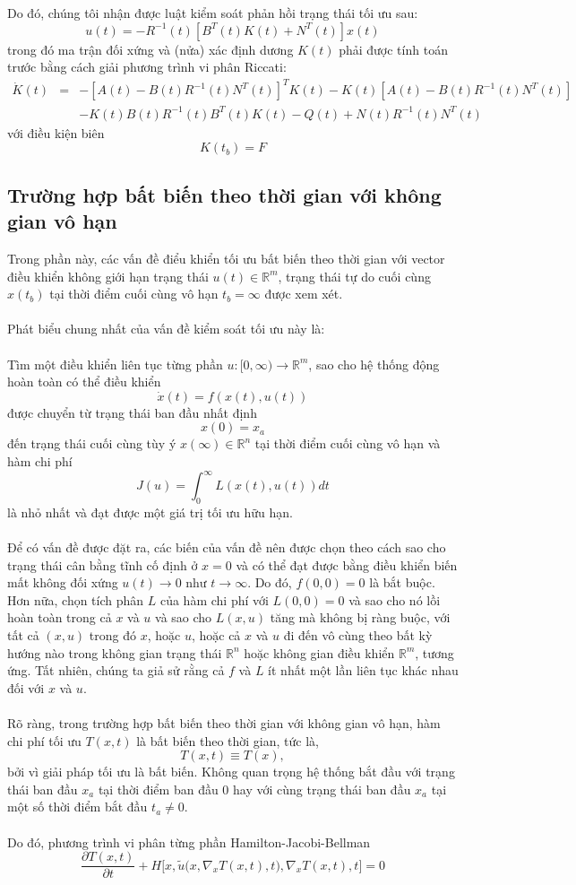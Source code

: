 \documentclass[12pt,a4paper]{report}
\begin{document}
	Do đó, chúng tôi nhận được luật kiểm soát phản hồi trạng thái tối ưu sau: $$u(t) = -R^{-1}(t)[B^T(t)K(t) + N^T(t)]x(t)$$
	trong đó ma trận đối xứng và (nửa) xác định dương $K(t)$ phải được tính toán trước bằng cách giải phương trình vi phân Riccati:
\begin{eqnarray}
	\dot{K}(t) &=& -[A(t) - B(t)R^{-1}(t)N^T(t)]^TK(t) - K(t)[A(t) - B(t)R^{-1}(t)N^T(t)] \nonumber \\ &&-K(t)B(t)R^{-1}(t)B^T(t)K(t) - Q(t) + N(t)R^{-1}(t)N^T(t) \nonumber
\end{eqnarray} với điều kiện biên $$K(t_b) = F$$
\subsection{Trường hợp bất biến theo thời gian với không gian vô hạn}
Trong phần này, các vấn đề điểu khiển tối ưu bất biến theo thời gian với vector điều khiển không giới hạn trạng thái $u(t) \in \mathbb{R}^m$, trạng thái tự do cuối cùng $x(t_b)$ tại thời điểm cuối cùng vô hạn $t_b = \infty$ được xem xét.\\\\Phát biểu chung nhất của vấn đề kiểm soát tối ưu này là:\\\\ 
Tìm một điều khiển liên tục từng phần $u: [0, \infty) \to \mathbb{R}^m$, sao cho hệ thống động hoàn toàn có thể điều khiển $$\dot{x}(t) = f(x(t), u(t))$$ được chuyển từ trạng thái ban đầu nhất định $$x(0) = x_a $$ đến trạng thái cuối cùng tùy ý $x(\infty) \in \mathbb{R}^n$ tại thời điểm cuối cùng vô hạn và hàm chi phí $$J(u) = \int_{0}^{\infty}L(x(t), u(t))dt$$ là nhỏ nhất và đạt được một giá trị tối ưu hữu hạn.	\\\\ Để có vấn đề được đặt ra, các biến của vấn đề nên được chọn theo cách sao cho trạng thái cân bằng tĩnh cố định ở $x = 0$ và có thể đạt được bằng điều khiển biến mất không đối xứng $u(t) \to 0$ như $t \to \infty$. Do đó, $f(0,0) = 0$ là bắt buộc. Hơn nữa, chọn tích phân $L$ của hàm chi phí với $L(0, 0) = 0$ và sao cho nó lồi hoàn toàn trong cả $x$ và $u$ và sao cho $L (x, u)$ tăng mà không bị ràng buộc, với tất cả $(x, u)$ trong đó $x$, hoặc $u$, hoặc cả $x$ và $u$ đi đến vô cùng theo bất kỳ hướng nào trong không gian trạng thái $\mathbb{R}^n$ hoặc không gian điều khiển $\mathbb{R}^m$, tương ứng. Tất nhiên, chúng ta giả sử rằng cả $f$ và $L$ ít nhất một lần liên tục khác nhau đối với $x$ và $u$. \\\\
Rõ ràng, trong trường hợp bất biến theo thời gian với không gian vô hạn, hàm chi phí tối ưu $T(x, t)$ là bất biến theo thời gian, tức là, $$T(x, t) \equiv T(x) ,$$ bởi vì giải pháp tối ưu là bất biến. Không quan trọng hệ thống bắt đầu với trạng thái ban đầu $x_a$ tại thời điểm ban đầu 0 hay với cùng trạng thái ban đầu $x_a$ tại một số thời điểm bắt đầu $t_a \neq 0.$ \\\\ Do đó, phương trình vi phân từng phần Hamilton-Jacobi-Bellman $$\frac{\partial T(x, t)}{\partial t} + H\Big[x, \tilde{u}\Big(x, \nabla_xT(x,t),t\Big), \nabla_xT(x, t), t\Big] = 0$$
\end{document}

